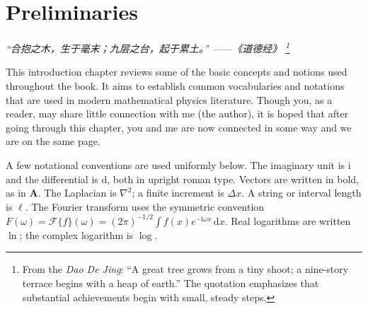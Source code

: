 \chapter{Preliminaries}
\renewcommand{\currentchapterpath}{chapters/prelim/}

\begin{flushright}
\textit{“合抱之木，生于毫末；九层之台，起于累土。” ——《道德经》
\footnote{From the \textit{Dao De Jing}: ``A great tree grows from a tiny shoot; a nine-story terrace begins with a heap of earth.'' The quotation emphasizes that substantial achievements begin with small, steady steps.}}
\end{flushright}

This introduction chapter reviews some of the basic concepts and notions used
throughout the book. It aims to establish common vocabularies
and notations that are used in modern mathematical physics literature.
Though you, as a reader, may share little connection with me (the author),
it is hoped that after going through this chapter,
you and me are now connected in some way and we are on the same page.

A few notational conventions are used uniformly below.
The imaginary unit is $\mathrm{i}$ and the differential is $\mathrm{d}$,
both in upright roman type.
Vectors are written in bold, as in $\mathbf{A}$.
The Laplacian is $\nabla^2$; a finite increment is $\Delta x$.
A string or interval length is $\ell$.
The Fourier transform uses the symmetric convention
$F(\omega)=\mathcal{F}\{f\}(\omega)=(2\pi)^{-1/2}\int f(x)e^{-\mathrm{i}\omega x}\,\mathrm{d}x$.
Real logarithms are written $\ln$; the complex logarithm is $\log$.


 

